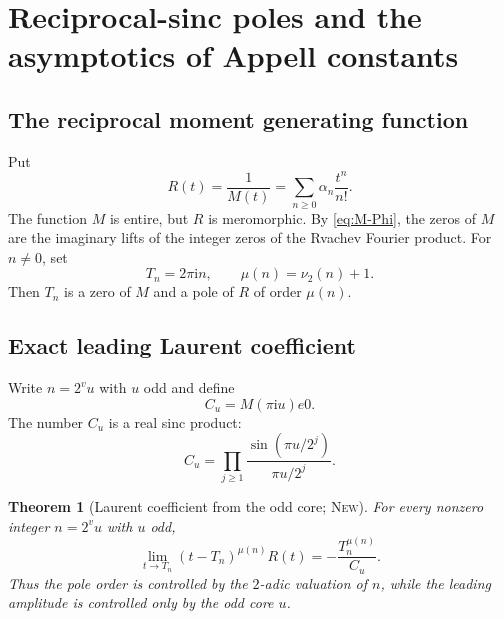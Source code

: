 \documentclass[11pt,oneside]{article}
\theoremstyle{frontier}
\newtheorem{theorem}{Theorem}[section]
\theoremstyle{definition}
\theoremstyle{remark}
\newcommand{\ii}{\mathrm i}
\newcommand{\vtwo}{\nu_2}
\newcommand{\statusnew}{\textsc{New}}
\begin{document}
\section{Reciprocal-sinc poles and the asymptotics of Appell constants}
\label{sec:poles}

\subsection{The reciprocal moment generating function}

Put
\begin{equation}
 R(t)=\frac1{M(t)}
 =\sum_{n\ge0}\alpha_n\frac{t^n}{n!}.
 \label{eq:R-def}
\end{equation}
The function $M$ is entire, but $R$ is meromorphic.  By \eqref{eq:M-Phi}, the zeros of $M$ are the
imaginary lifts of the integer zeros of the Rvachev Fourier product.  For $n\ne0$, set
\begin{equation}
 T_n=2\pi\ii n,
 \qquad
 \mu(n)=\vtwo(n)+1.
 \label{eq:T-mu}
\end{equation}
Then $T_n$ is a zero of $M$ and a pole of $R$ of order $\mu(n)$.

\subsection{Exact leading Laurent coefficient}

Write $n=2^vu$ with $u$ odd and define
\begin{equation}
 C_u=M(\pi\ii u)
e0.
 \label{eq:Cu}
\end{equation}
The number $C_u$ is a real sinc product:
\begin{equation}
 C_u=\prod_{j\ge1}\frac{\sin(\pi u/2^j)}{\pi u/2^j}.
 \label{eq:Cu-product}
\end{equation}

\begin{theorem}[Laurent coefficient from the odd core; \statusnew]
\label{thm:Laurent-leading}
For every nonzero integer $n=2^vu$ with $u$ odd,
\begin{equation}
 \boxed{
 \lim_{t\to T_n}(t-T_n)^{\mu(n)}R(t)
 =-\frac{T_n^{\mu(n)}}{C_u}.
 }
 \label{eq:Laurent-leading}
\end{equation}
Thus the pole order is controlled by the $2$-adic valuation of $n$, while the leading amplitude is
controlled only by the odd core $u$.
\end{theorem}
\end{document}
